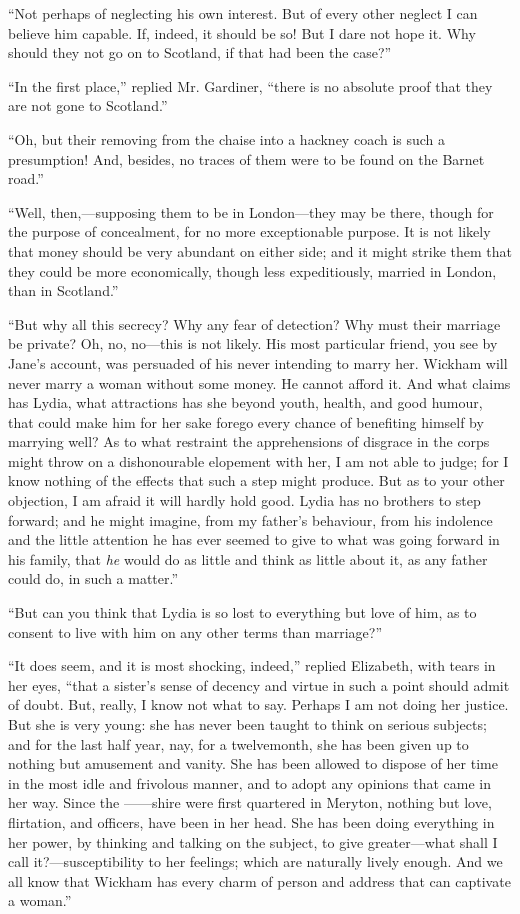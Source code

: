 ``Not perhaps of neglecting his own interest. But of every other neglect I can believe him capable. If, indeed, it should be so! But I dare not hope it. Why should they not go on to Scotland, if that had been the case?''

``In the first place,'' replied Mr. Gardiner, ``there is no absolute proof that they are not gone to Scotland.''

``Oh, but their removing from the chaise into a hackney coach is such a presumption! And, besides, no traces of them were to be found on the Barnet road.''

``Well, then,---supposing them to be in London---they may be there, though for the purpose of concealment, for no more exceptionable purpose. It is not likely that money should be very abundant on either side; and it might strike them that they could be more economically, though less expeditiously, married in London, than in Scotland.''

``But why all this secrecy? Why any fear of detection? Why must their marriage be private? Oh, no, no---this is not likely. His most particular friend, you see by Jane's account, was persuaded of his never intending to marry her. Wickham will never marry a woman without some money. He cannot afford it. And what claims has Lydia, what attractions has she beyond youth, health, and good humour, that could make him for her sake forego every chance of benefiting himself by marrying well? As to what restraint the apprehensions of disgrace in the corps might throw on a dishonourable elopement with her, I am not able to judge; for I know nothing of the effects that such a step might produce. But as to your other objection, I am afraid it will hardly hold good. Lydia has no brothers to step forward; and he might imagine, from my father's behaviour, from his indolence and the little attention he has ever seemed to give to what was going forward in his family, that \textit{he} would do as little and think as little about it, as any father could do, in such a matter.''

``But can you think that Lydia is so lost to everything but love of him, as to consent to live with him on any other terms than marriage?''

``It does seem, and it is most shocking, indeed,'' replied Elizabeth, with tears in her eyes, ``that a sister's sense of decency and virtue in such a point should admit of doubt. But, really, I know not what to say. Perhaps I am not doing her justice. But she is very young: she has never been taught to think on serious subjects; and for the last half year, nay, for a twelvemonth, she has been given up to nothing but amusement and vanity. She has been allowed to dispose of her time in the most idle and frivolous manner, and to adopt any opinions that came in her way. Since the ------shire were first quartered in Meryton, nothing but love, flirtation, and officers, have been in her head. She has been doing everything in her power, by thinking and talking on the subject, to give greater---what shall I call it?---susceptibility to her feelings; which are naturally lively enough. And we all know that Wickham has every charm of person and address that can captivate a woman.''

